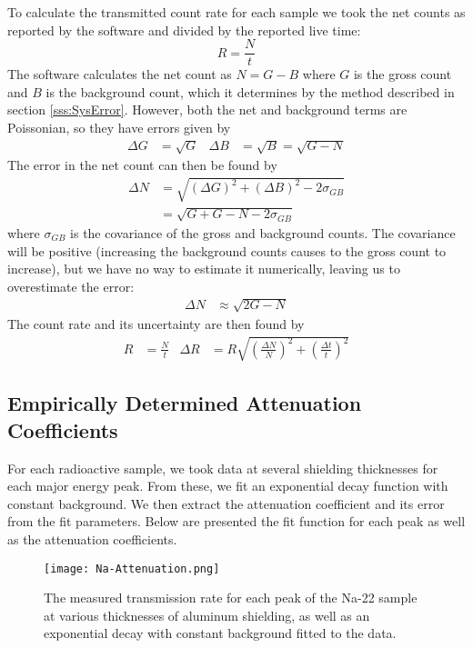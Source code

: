 \documentclass[letter]{article}
\begin{document}
To calculate the transmitted count rate for each sample we took the net counts as reported by the software and divided by the reported live time:
\begin{equation}
R = \frac{N}{t}
\end{equation}
The software calculates the net count as $N = G - B$ where $G$ is the gross count and $B$ is the background count, which it determines by the method described in section \ref{sss:SysError}. However, both the net and background terms are Poissonian, so they have errors given by
\begin{align}
\Delta G &= \sqrt{G} &
\Delta B &= \sqrt{B} = \sqrt{G - N}
\end{align}
The error in the net count can then be found by
\begin{align}
\Delta N 
&= 
\sqrt{ (\Delta G)^2 + (\Delta B)^2 - 2 \sigma_{GB}}
\\&=
\sqrt{ G + G - N - 2 \sigma_{GB}}
\end{align}
where $\sigma_{GB}$ is the covariance of the gross and background counts. The covariance will be positive (increasing the background counts causes to the gross count to increase), but we have no way to estimate it numerically, leaving us to overestimate the error:
\begin{align}
\Delta N &\approx \sqrt{2G - N}
\end{align} 
The count rate and its uncertainty are then found by
\begin{align}
R &= \frac{N}{t}
&
\Delta R &= R \sqrt{ \left( \frac{\Delta N}{N} \right)^2 + \left( \frac{\Delta t}{t} \right)^2}
\end{align}


\subsection{Empirically Determined Attenuation Coefficients}

For each radioactive sample, we took data at several shielding thicknesses for each major energy peak. From these, we fit an exponential decay function with constant background. We then extract the attenuation coefficient and its error from the fit parameters. Below are presented the fit function for each peak as well as the attenuation coefficients.

\begin{figure}[h] \centering
    \texttt{[image: Na-Attenuation.png]}
    \caption{The measured transmission rate for each peak of the Na-22 sample at various thicknesses of aluminum shielding, as well as an exponential decay with constant background fitted to the data.}
    \label{fig:NaAtten}
\end{figure}
\end{document}
